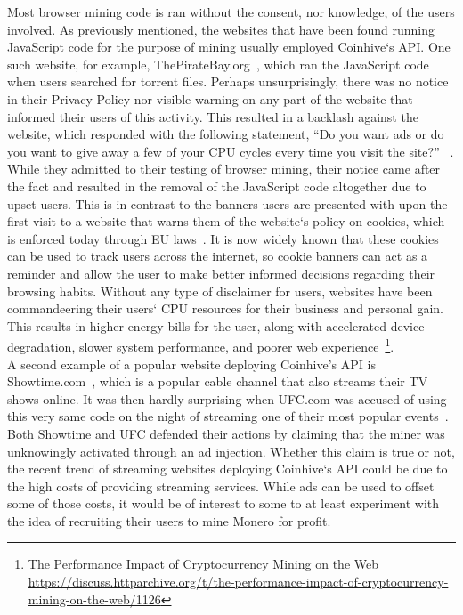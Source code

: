 Most browser mining code is ran without the consent, nor knowledge, of the users involved. As previously mentioned, the websites that have been found running JavaScript code for the purpose of mining usually employed Coinhive`s API. One such website, for example, ThePirateBay.org~\cite{bbcmintcrypto}, which ran the JavaScript code when users searched for torrent files. Perhaps unsurprisingly, there was no notice in their Privacy Policy nor visible warning on any part of the website that informed their users of this activity. This resulted in a backlash against the website, which responded with the following statement, ``Do you want ads or do you want to give away a few of your CPU cycles every time you visit the site?'' ~\cite{piratesbayblog}. While they admitted to their testing of browser mining, their notice came after the fact and resulted in the removal of the JavaScript code altogether due to upset users. This is in contrast to the banners users are presented with upon the first visit to a website that warns them of the website`s policy on cookies, which is enforced today through EU laws~\cite{eucookie}. It is now widely known that these cookies can be used to track users across the internet, so cookie banners can act as a reminder and allow the user to make better informed decisions regarding their browsing habits. Without any type of disclaimer for users, websites have been commandeering their users` CPU resources for their business and personal gain. This results in higher energy bills for the user, along with accelerated device degradation, slower system performance, and poorer web experience~\cite{gaurdianelectricity}\footnote{The Performance Impact of Cryptocurrency Mining on the Web \url{https://discuss.httparchive.org/t/the-performance-impact-of-cryptocurrency-mining-on-the-web/1126}}.
\\
A second example of a popular website deploying Coinhive’s API is Showtime.com~\cite{gaurdianelectricity}, which is a popular cable channel that also streams their TV shows online. It was then hardly surprising when UFC.com was accused of using this very same code on the night of streaming one of their most popular events~\cite{registerufcmonero}. Both Showtime and UFC defended their actions by claiming that the miner was unknowingly activated through an ad injection. Whether this claim is true or not, the recent trend of streaming websites deploying Coinhive`s API could be due to the high costs of providing streaming services. While ads can be used to offset some of those costs, it would be of interest to some to at least experiment with the idea of recruiting their users to mine Monero for profit.
